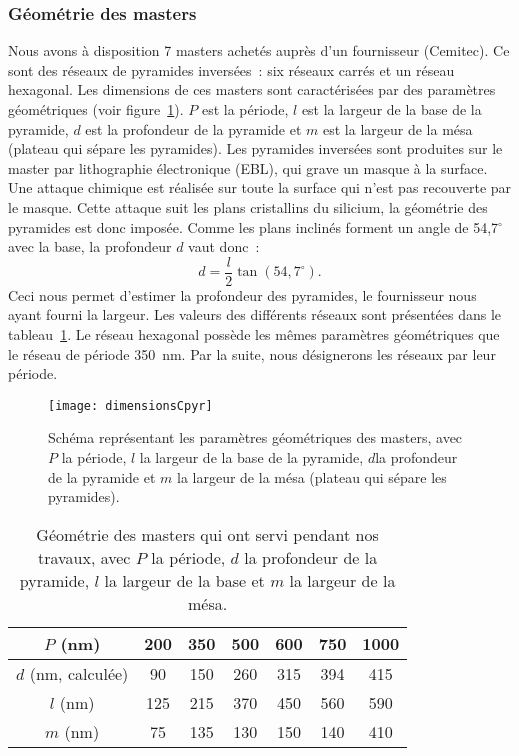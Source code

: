 	\subsubsection{Géométrie des masters}
Nous avons à disposition 7 masters achetés auprès d’un fournisseur (Cemitec). Ce sont des réseaux de pyramides inversées~: six réseaux carrés et un réseau hexagonal. Les dimensions de ces masters sont caractérisées par des paramètres géométriques (voir figure~\ref{dimensionsCpyrChapter3}). $P$ est la période, $l$ est la largeur de la base de la pyramide, $d$ est la profondeur de la pyramide et $m$ est la largeur de la mésa (plateau qui sépare les pyramides). Les pyramides inversées sont produites sur le master par lithographie électronique (EBL), qui grave un masque à la surface. Une attaque chimique est réalisée sur toute la surface qui n'est pas recouverte par le masque. Cette attaque suit les plans cristallins du silicium, la géométrie des pyramides est donc imposée. Comme les plans inclinés forment un angle de 54,7$^\circ$ avec la base, la profondeur $d$ vaut donc~:
\begin{equation}
d = \dfrac{l}{2}\tan(54,7^\circ).
\end{equation}
Ceci nous permet d’estimer la profondeur des pyramides, le fournisseur nous ayant fourni la largeur. Les valeurs des différents réseaux sont présentées dans le tableau~\ref{tGeometrie}. Le réseau hexagonal possède les mêmes paramètres géométriques que le réseau de période 350~nm. Par la suite, nous désignerons les réseaux par leur période.\par 

\begin{figure}[!htb]
\centering
\texttt{[image: dimensionsCpyr]}
\caption{Schéma représentant les paramètres géométriques des masters, avec $P$ la période, $l$ la largeur de la base de la pyramide, $d$la profondeur de la pyramide et $m$ la largeur de la mésa (plateau qui sépare les pyramides).}
\label{dimensionsCpyrChapter3}
\end{figure}

\begin{table}[!htb]
\centering
\begin{tabular}{ccccccc}
\hline
$P$ (nm) & 200 & 350 & 500 & 600 & 750 & 1000\\
\hline
$d$ (nm, calculée) & 90 & 150 & 260 & 315 & 394 & 415\\
$l$ (nm) & 125 & 215 & 370 & 450 & 560 & 590\\
$m$ (nm) & 75 & 135 & 130 & 150 & 140 & 410\\
\hline
\end{tabular}
\caption{Géométrie des masters qui ont servi pendant nos travaux, avec $P$ la période, $d$ la profondeur de la pyramide, $l$ la largeur de la base et $m$ la largeur de la mésa.}
\label{tGeometrie}
\end{table}

